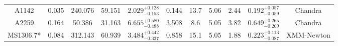 \documentclass{aa}   %
\begin{document}
\begin{table}[h!]
\begin{center}
\begin{tabular}{ c  c  c  c c c c c c c c }
A1142               		&		0.035	&	240.076	&	59.151	& $	2.029^{+0.128}_{-0.153}$  &      0.144	&  13.7	&	5.06	&	2.44	&	$ 0.192^{+0.057}_{-0.059}  $ &	  Chandra     \\
A2259               		&		0.164	&	50.386	&	31.163	& $	6.655^{+0.580}_{-0.488}$  &      3.508	&  8.6	&	5.05	&	3.82	&	$ 0.649^{+0.265}_{-0.269}  $ &	  Chandra     \\
MS1306.7*           		&		0.084	&	312.143	&	60.939	& $	3.484^{+0.442}_{-0.337}$  &      0.858	&  15.1	&	5.05	&	1.88	&  	$ 0.223^{+0.113}_{-0.087}  $ &	  XMM-Newton  \\



 \hline 
 

\end{tabular}
\end{center}
\end{table}
\end{document}
